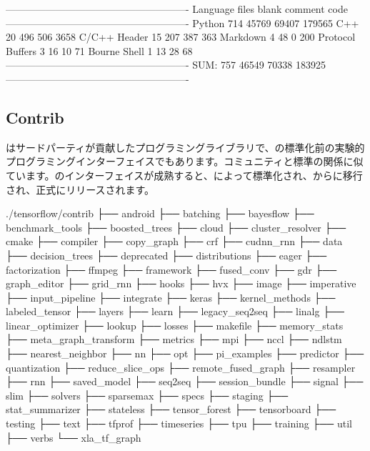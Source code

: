 \begin{content}
\begin{leftbar}
\begin{python}[caption={Pythonコード統計}]
-------------------------------------------------------
Language            files     blank   comment      code
-------------------------------------------------------
Python                714     45769     69407    179565
C++                    20       496       506      3658
C/C++ Header           15       207       387       363
Markdown                4        48         0       200
Protocol Buffers        3        16        10        71
Bourne Shell            1        13        28        68
-------------------------------------------------------
SUM:                  757     46549     70338    183925
-------------------------------------------------------
\end{python}
\end{leftbar}

\subsection{Contrib}

はサードパーティが貢献したプログラミングライブラリで、\tf{}の標準化前の実験的プログラミングインターフェイスでもあります。コミュニティと標準の関係に似ています。のインターフェイスが成熟すると、\tf{}によって標準化され、からに移行され、正式にリリースされます。

\begin{leftbar}
\begin{python}[caption={Contribソースコード構造}]
./tensorflow/contrib
├── android
├── batching
├── bayesflow
├── benchmark_tools
├── boosted_trees
├── cloud
├── cluster_resolver
├── cmake
├── compiler
├── copy_graph
├── crf
├── cudnn_rnn
├── data
├── decision_trees
├── deprecated
├── distributions
├── eager
├── factorization
├── ffmpeg
├── framework
├── fused_conv
├── gdr
├── graph_editor
├── grid_rnn
├── hooks
├── hvx
├── image
├── imperative
├── input_pipeline
├── integrate
├── keras
├── kernel_methods
├── labeled_tensor
├── layers
├── learn
├── legacy_seq2seq
├── linalg
├── linear_optimizer
├── lookup
├── losses
├── makefile
├── memory_stats
├── meta_graph_transform
├── metrics
├── mpi
├── nccl
├── ndlstm
├── nearest_neighbor
├── nn
├── opt
├── pi_examples
├── predictor
├── quantization
├── reduce_slice_ops
├── remote_fused_graph
├── resampler
├── rnn
├── saved_model
├── seq2seq
├── session_bundle
├── signal
├── slim
├── solvers
├── sparsemax
├── specs
├── staging
├── stat_summarizer
├── stateless
├── tensor_forest
├── tensorboard
├── testing
├── text
├── tfprof
├── timeseries
├── tpu
├── training
├── util
├── verbs
└── xla_tf_graph
\end{python}
\end{leftbar}


\end{content}
